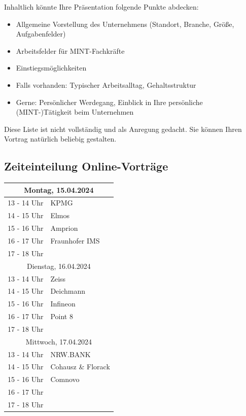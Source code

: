 \documentclass[
  paper=a4,
  fontsize=12pt,
  DIV=16,
  headheight=30pt,
  footheight=45pt,
  headinclude,
  parskip=half,
]{scrartcl}
\begin{document}
Inhaltlich könnte Ihre Präsentation folgende Punkte abdecken:
\begin{itemize}
    \item Allgemeine Vorstellung des Unternehmens (Standort, Branche, Größe, Aufgabenfelder)
    \item Arbeitsfelder für MINT-Fachkräfte
    \item Einstiegsmöglichkeiten
    \item Falls vorhanden: Typischer Arbeitsalltag, Gehaltsstruktur
    \item Gerne: Persönlicher Werdegang, Einblick in Ihre persönliche (MINT-)Tätigkeit beim Unternehmen
\end{itemize} 

Diese Liste ist nicht vollständig und als Anregung gedacht.
Sie können Ihren Vortrag natürlich beliebig gestalten.

\subsection*{Zeiteinteilung Online-Vorträge}

\begin{table}[h!]
    \centering
\begin{tabular}{|c|l|}
    \hline
    \multicolumn{2}{|c|}{Montag, 15.04.2024} \\
    \hline
    \rowcolor{gray!10} 13 - 14 Uhr & KPMG \\
    \rowcolor{gray!30} 14 - 15 Uhr & Elmos \\
    \rowcolor{gray!10} 15 ­- 16 Uhr & Amprion \\
    \rowcolor{gray!30} 16 - 17 Uhr & Fraunhofer IMS\\
    \rowcolor{gray!10} 17 ­- 18 Uhr & \\
    \hline
    \multicolumn{2}{|c|}{Dienstag, 16.04.2024} \\
    \hline
    \rowcolor{gray!10} 13 - 14 Uhr & Zeiss \\
    \rowcolor{gray!30} 14 - 15 Uhr & Deichmann \\
    \rowcolor{gray!10} 15 ­- 16 Uhr & Infineon\\
    \rowcolor{gray!30} 16 - 17 Uhr & Point 8 \\
    \rowcolor{gray!10} 17 ­- 18 Uhr &  \\
    \hline
    \multicolumn{2}{|c|}{Mittwoch, 17.04.2024} \\
    \hline
    \rowcolor{gray!10} 13 - 14 Uhr & NRW.BANK \\
    \rowcolor{gray!30} 14 - 15 Uhr & Cohausz \& Florack \\
    \rowcolor{gray!10} 15 ­- 16 Uhr & Comnovo \\
    \rowcolor{gray!30} 16 - 17 Uhr & \\
    \rowcolor{gray!10} 17 ­- 18 Uhr & \\
    \hline
    \end{tabular}

\end{table}
\end{document}
